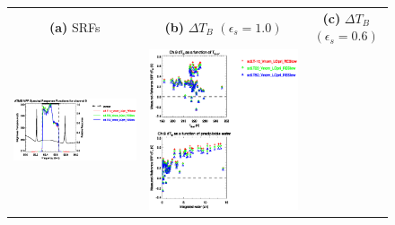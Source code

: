 \begin{figure}[H]
  \centering
  \begin{tabular}{c c c}
    \textsf{\textbf{(a)} SRFs} &
    \textsf{\textbf{(b)} $\Delta T_B$ $(\epsilon_s = 1.0)$} &
    \textsf{\textbf{(c)} $\Delta T_B$ $(\epsilon_s = 0.6)$} \\
    \includegraphics[bb=80 400 280 558,clip,scale=0.85]{graphics/srf/Tset/atms_npp.ch9.osrf.eps} &
    \includegraphics[bb=85 400 260 558,clip,scale=0.85]{graphics/dtb/Tset/e1.0_r0.0/atms_npp.ch9.dTb.eps} & 

\end{tabular}
\end{figure}
